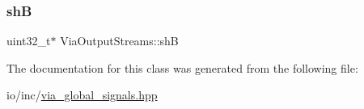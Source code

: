 \subsubsection{\texorpdfstring{shB}{shB}}
{\footnotesize\ttfamily uint32\+\_\+t$\ast$ Via\+Output\+Streams\+::shB}



The documentation for this class was generated from the following file\+:\begin{DoxyCompactItemize}
\item 
io/inc/\mbox{\hyperlink{via__global__signals_8hpp}{via\+\_\+global\+\_\+signals.\+hpp}}\end{DoxyCompactItemize}
